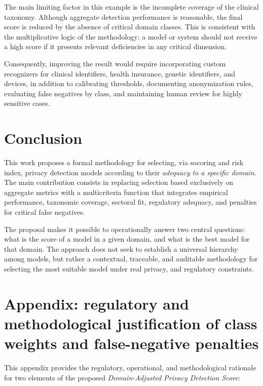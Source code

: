 \documentclass[11pt,a4paper]{article}
\begin{document}
The main limiting factor in this example is the incomplete coverage of the clinical taxonomy. Although aggregate detection performance is reasonable, the final score is reduced by the absence of critical domain classes. This is consistent with the multiplicative logic of the methodology: a model or system should not receive a high score if it presents relevant deficiencies in any critical dimension.

Consequently, improving the result would require incorporating custom recognizers for clinical identifiers, health insurance, genetic identifiers, and devices, in addition to calibrating thresholds, documenting anonymization rules, evaluating false negatives by class, and maintaining human review for highly sensitive cases.

\section{Conclusion}

This work proposes a formal methodology for selecting, via socoring and risk index, privacy detection models according to their \textit{adequacy to a specific domain}. The main contribution consists in replacing selection based exclusively on aggregate metrics with a multicriteria function that integrates empirical performance, taxonomic coverage, sectoral fit, regulatory adequacy, and penalties for critical false negatives.

The proposal makes it possible to operationally answer two central questions: what is the score of a model in a given domain, and what is the best model for that domain. The approach does not seek to establish a universal hierarchy among models, but rather a contextual, traceable, and auditable methodology for selecting the most suitable model under real privacy,  and regulatory constraints.


\appendix

\appendix

\section{Appendix: regulatory and methodological justification of class weights and false-negative penalties}

\label{app:weights_fn_justification}

This appendix provides the regulatory, operational, and methodological rationale for two elements of the proposed \textit{Domain-Adjusted Privacy Detection Score}: 
\end{document}
